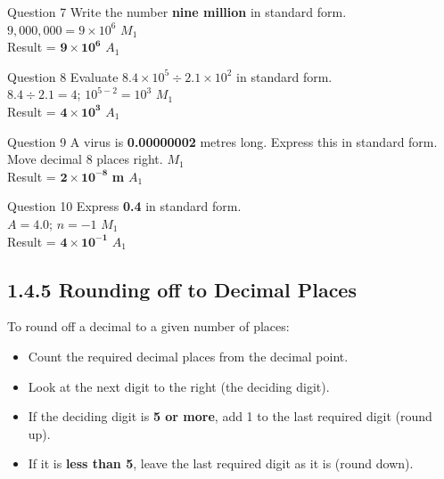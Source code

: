 \documentclass[12pt, a4paper, oneside]{article}
\begin{document}
\begin{solvingbox}{Question 7}
Write the number \textbf{nine million} in standard form. \\
$9,000,000 = 9 \times 10^6$ \hfill $M_1$ \\
Result = $\mathbf{9 \times 10^6}$ \hfill $A_1$
\end{solvingbox}

\begin{solvingbox}{Question 8}
Evaluate \textbf{$8.4 \times 10^5 \div 2.1 \times 10^2$} in standard form. \\
$8.4 \div 2.1 = 4$; $10^{5-2} = 10^3$ \hfill $M_1$ \\
Result = $\mathbf{4 \times 10^3}$ \hfill $A_1$
\end{solvingbox}

\begin{solvingbox}{Question 9}
A virus is \textbf{0.00000002} metres long. Express this in standard form. \\
Move decimal 8 places right. \hfill $M_1$ \\
Result = $\mathbf{2 \times 10^{-8}}$ \textbf{m} \hfill $A_1$
\end{solvingbox}

\begin{solvingbox}{Question 10}
Express \textbf{0.4} in standard form. \\
$A = 4.0$; $n = -1$ \hfill $M_1$ \\
Result = $\mathbf{4 \times 10^{-1}}$ \hfill $A_1$
\end{solvingbox}

\subsection*{1.4.5 Rounding off to Decimal Places}

\begin{tcolorbox}[colback=lightgrey, colframe=primaryblue, title=\textbf{Concept Summary}, arc=5pt]
    To round off a decimal to a given number of places:
    \begin{itemize}
        \item Count the required decimal places from the decimal point.
        \item Look at the next digit to the right (the deciding digit).
        \item If the deciding digit is \textbf{5 or more}, add 1 to the last required digit (round up).
        \item If it is \textbf{less than 5}, leave the last required digit as it is (round down).
    \end{itemize}
\end{tcolorbox}
\end{document}

